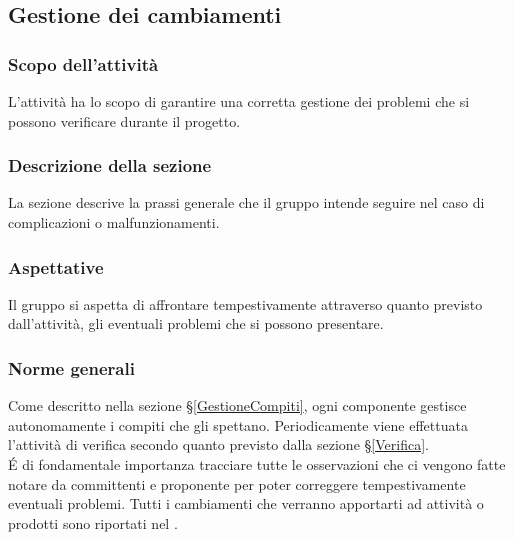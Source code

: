\subsection{Gestione dei cambiamenti}\label{GestioneCambiamenti}
\subsubsection{Scopo dell'attività} 
L'attività ha lo scopo di garantire una corretta gestione dei problemi che si possono verificare durante il progetto.

\subsubsection{Descrizione della sezione} 
La sezione descrive la prassi generale che il gruppo intende seguire nel caso di complicazioni o malfunzionamenti.

\subsubsection{Aspettative}
Il gruppo si aspetta di affrontare tempestivamente attraverso quanto previsto dall'attività, gli eventuali problemi che si possono presentare.

\subsubsection{Norme generali} \label{GCambiamenti_Norme}
Come descritto nella sezione \S\ref{GestioneCompiti}, ogni componente gestisce autonomamente i compiti che gli spettano. Periodicamente viene effettuata l'attività di verifica secondo quanto previsto dalla sezione \S\ref{Verifica}.\\ É di fondamentale importanza tracciare tutte le osservazioni che ci vengono fatte notare da committenti e proponente per poter correggere tempestivamente eventuali problemi. 
Tutti i cambiamenti che verranno apportarti ad attività o prodotti sono riportati nel \textit{\PdQ}.

